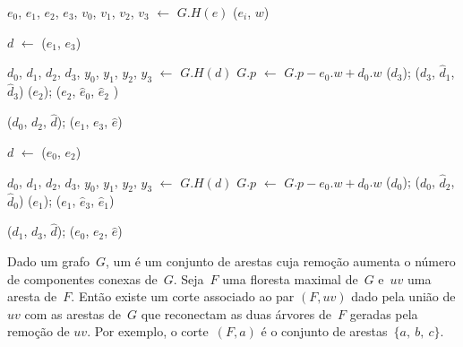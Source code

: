\begin{algorithm}[htb]
\caption{\MSFupdate($G$, $e$, $w$)}
\label{Algo:MSFupdate}
\begin{algorithmic}[1]
	\State $e_0$, $e_1$, $e_2$, $e_3$, $v_0$, $v_1$, $v_2$, $v_3$ $\gets$ $G.H(e)$ \label{Algo:MSFupdate:linha:const1}
 \label{Algo:MSFupdate:linha:laçosetpeso}
\State  \LCOAddCost($e_i$, $w$)
\EndFor

\label{Algo:MSFupdate:linha:if} 
\State $d$ $\gets$ \LCOMin($e_1$, $e_3$)\label{Algo:MSFupdate:linhamin}

\State $d_0$, $d_1$, $d_2$, $d_3$, $y_0$, $y_1$, $y_2$, $y_3$ $\gets$ $G.H(d)$ \label{Algo:MSFupdate:linha:const2}
\label{Algo:MSFupdate:linha:compara}
\State $G$.$p$ $\gets$ $G.p-e_0.w+d_0$.$w$ \label{Algo:MSFupdate:linha:atualizaPeso}
\State \LCOCycle($d_3$); \LCOSplit($d_3$, $\hat d_1$, $\hat d_3$)
\State \LCOCycle($e_2$); \LCOSplit($e_2$, $\hat e_0$, $\hat e_2$ )\label{Algo:MSFupdate:linhasplit}

\State \LCOMerge($d_0$, $d_2$, $\hat d$); \LCOMerge($e_1$, $e_3$, $\hat e$)\label{Algo:MSFupdate:linhas:Merge}

\EndIf

\Else{}
\State $d$ $\gets$ \LCOMax($e_0$, $e_2$)\label{Algo:MSFupdate:dualinicio}

\State $d_0$, $d_1$, $d_2$, $d_3$, $y_0$, $y_1$, $y_2$, $y_3$ $\gets$ $G.H(d)$\label{Algo:MSFupdate:linha:const3}
\State $G$.$p$ $\gets$ $G$.$p-e_0.w+d_0$.$w$\label{Algo:MSFupdate:linha:const4}
\State \LCOCycle($d_0$); \LCOSplit($d_0$, $\hat d_2$, $\hat d_0$)
\State \LCOCycle($e_1$); \LCOSplit($e_1$, $\hat e_3$, $\hat e_1$)

\State \LCOMerge($d_1$, $d_3$, $\hat d$); \LCOMerge($e_0$, $e_2$, $\hat e$)

\EndIf
\EndIf\label{Algo:MSFupdate:dualfim}
\end{algorithmic}
\end{algorithm}

Dado um grafo~$G$, um  é um conjunto de arestas cuja remoção aumenta o número de componentes conexas de~$G$.
Seja~$F$ uma floresta maximal de~$G$ e~$uv$ uma aresta de~$F$.
Então existe um corte associado ao par $(F, uv)$ dado pela união de $uv$ com as arestas de~$G$ que reconectam as duas árvores de~$F$ geradas pela remoção de $uv$.
Por exemplo, o corte~$(F, a)$ é o conjunto de arestas~$\{a,~b,~c\}$.


